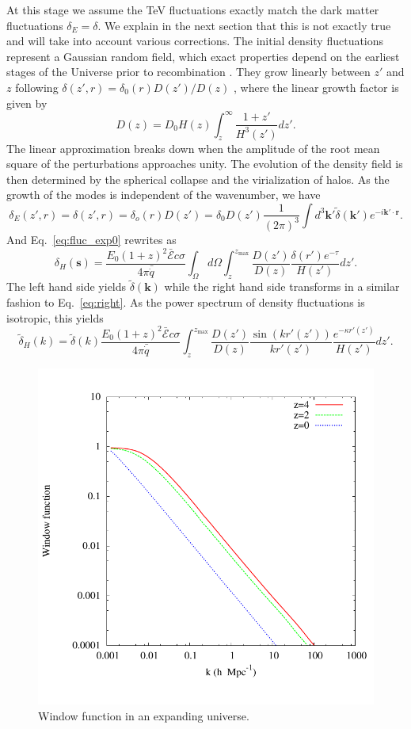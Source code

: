 \documentclass[twocolumns]{emulateapj}
\begin{document}
At this stage we assume the TeV fluctuations exactly match the dark matter fluctuations $\delta_E=\delta$. We explain in the next section that this is not exactly true and will take into account various corrections. The initial density fluctuations represent a Gaussian random field, which exact properties depend on the earliest stages of the Universe prior to recombination \citep{1986ApJ...304...15B,Peebles}. They grow linearly between $z'$ and $z$ following $\delta(z',r)=\delta_0(r)D(z')/D(z)$ \citep{ 1977MNRAS.179..351H}, where the linear growth factor is given by
\begin{equation}
\label{eq:growth_1}
D(z)=D_0H(z)\int_z^{\infty}\frac{1+z'}{H^3(z')}dz'.
\end{equation}
The linear approximation breaks down when the amplitude of the root mean square of the perturbations approaches unity. The evolution of the density field is then determined by the spherical collapse \citep{1972ApJ...176....1G} and the virialization of halos. As the growth of the modes is independent of the wavenumber, we have
\begin{equation}
\label{eq:FT_delta}
\delta_E(z',r)=\delta(z',r)=\delta_o(r)D(z')=\delta_0D(z')\frac{1}{(2\pi)^3}\int d^3\mathbf{k'} \tilde{\delta}(\mathbf{k'}) e^{-i\mathbf{k'}\cdot\mathbf{r}}.
\end{equation}
And Eq.~\eqref{eq:fluc_exp0} rewrites as
\begin{equation}
\label{eq:heat_fluc_exp0}
\delta_H(\mathbf{s})=\frac{ E_0(1+z)^2 \bar{\mathcal{E}} c\sigma}{4\pi\bar{\dot{q}}} \int_{\Omega}d\Omega\int_z^{z_{\mathrm{max}}} \frac{D(z')}{D(z)} \frac{\delta(r') e^{-\tau}}{H(z')}dz'.
\end{equation}
The left hand side yields $\tilde{\delta}(\mathbf{k})$ while the right hand side transforms in a similar fashion to Eq.~\eqref{eq:right}. As the power spectrum of density fluctuations is isotropic, this yields
\begin{equation}
\label{eq:heat_fluc_exp1}
\tilde{\delta}_H(k)=\tilde{\delta}(k) \frac{E_0(1+z)^2\bar{\mathcal{E}}c\sigma}{4\pi\bar{\dot{q}}} \int_z^{z_{\mathrm{max}}} \frac{D(z')}{D(z)}\frac{\sin(kr'(z'))}{kr'(z')} \frac{e^{-\kappa r'(z')}} {H(z')} dz'.
\end{equation}
\begin{figure}[h]
\centering
\includegraphics[width = .45\textwidth ]{window_nobiases-eps-converted-to}
\caption{Window function in an expanding universe.}
\label{fig:window_nobiases}
\end{figure}
\end{document}
